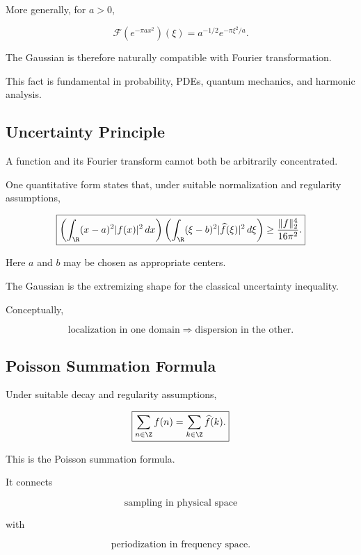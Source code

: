 More generally, for \(a>0\),

\[
\boxed{
\mathcal{F}
\left(
e^{-\pi a x^2}
\right)(\xi)
=
a^{-1/2}
e^{-\pi\xi^2/a}.
}
\]

The Gaussian is therefore naturally compatible with Fourier
transformation.

This fact is fundamental in probability, PDEs, quantum mechanics, and
harmonic analysis.

\subsection{Uncertainty Principle}
\label{subsec:uncertainty-principle-fourier}

A function and its Fourier transform cannot both be arbitrarily
concentrated.

One quantitative form states that, under suitable normalization and
regularity assumptions,

\[
\boxed{
\left(
\int_{\R}
(x-a)^2|f(x)|^2\,dx
\right)
\left(
\int_{\R}
(\xi-b)^2|\widehat{f}(\xi)|^2\,d\xi
\right)
\geq
\frac{\|f\|_2^4}{16\pi^2}.
}
\]

Here \(a\) and \(b\) may be chosen as appropriate centers.

The Gaussian is the extremizing shape for the classical uncertainty
inequality.

Conceptually,

\[
\boxed{
\text{localization in one domain}
\Longrightarrow
\text{dispersion in the other}.
}
\]

\subsection{Poisson Summation Formula}
\label{subsec:poisson-summation}

Under suitable decay and regularity assumptions,

\[
\boxed{
\sum_{n\in\Z}f(n)
=
\sum_{k\in\Z}\widehat{f}(k).
}
\]

This is the Poisson summation formula.

It connects

\[
\boxed{
\text{sampling in physical space}
}
\]

with

\[
\boxed{
\text{periodization in frequency space}.
}
\]

